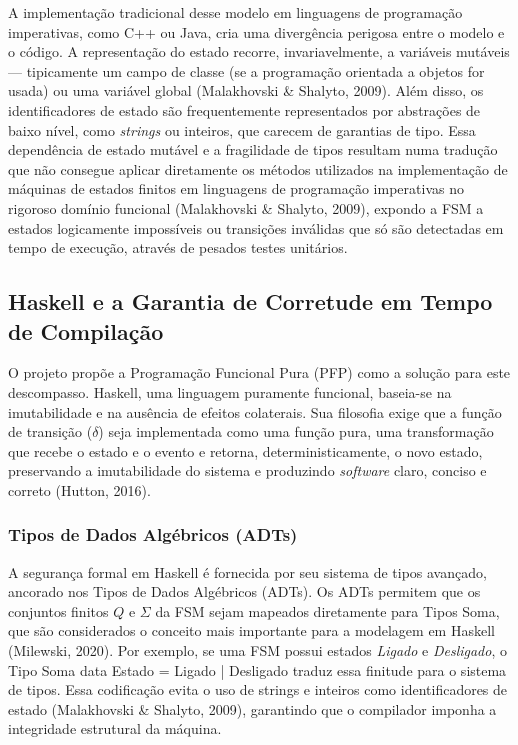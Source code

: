 \documentclass[12pt,a4paper]{article}
\begin{document}
A implementação tradicional desse modelo em linguagens de programação imperativas, como C++ ou Java, cria uma divergência perigosa entre o modelo e o código. A representação do estado recorre, invariavelmente, a variáveis mutáveis --- tipicamente um campo de classe (se a programação orientada a objetos for usada) ou uma variável global (Malakhovski \& Shalyto, 2009). Além disso, os identificadores de estado são frequentemente representados por abstrações de baixo nível, como \textit{strings} ou inteiros, que carecem de garantias de tipo. Essa dependência de estado mutável e a fragilidade de tipos resultam numa tradução que não consegue aplicar diretamente os métodos utilizados na implementação de máquinas de estados finitos em linguagens de programação imperativas no rigoroso domínio funcional (Malakhovski \& Shalyto, 2009), expondo a FSM a estados logicamente impossíveis ou transições inválidas que só são detectadas em tempo de execução, através de pesados testes unitários.

\subsection{Haskell e a Garantia de Corretude em Tempo de Compilação}
O projeto propõe a Programação Funcional Pura (PFP) como a solução para este descompasso. Haskell, uma linguagem puramente funcional, baseia-se na imutabilidade e na ausência de efeitos colaterais. Sua filosofia exige que a função de transição ($\delta$) seja implementada como uma função pura, uma transformação que recebe o estado e o evento e retorna, deterministicamente, o novo estado, preservando a imutabilidade do sistema e produzindo \textit{software} claro, conciso e correto (Hutton, 2016).

\subsubsection{Tipos de Dados Algébricos (ADTs)}
A segurança formal em Haskell é fornecida por seu sistema de tipos avançado, ancorado nos Tipos de Dados Algébricos (ADTs). Os ADTs permitem que os conjuntos finitos $Q$ e $\Sigma$ da FSM sejam mapeados diretamente para Tipos Soma, que são considerados o conceito mais importante para a modelagem em Haskell (Milewski, 2020). Por exemplo, se uma FSM possui estados \textit{Ligado} e \textit{Desligado}, o Tipo Soma data Estado = Ligado | Desligado traduz essa finitude para o sistema de tipos. Essa codificação evita o uso de strings e inteiros como identificadores de estado (Malakhovski \& Shalyto, 2009), garantindo que o compilador imponha a integridade estrutural da máquina.
\end{document}
